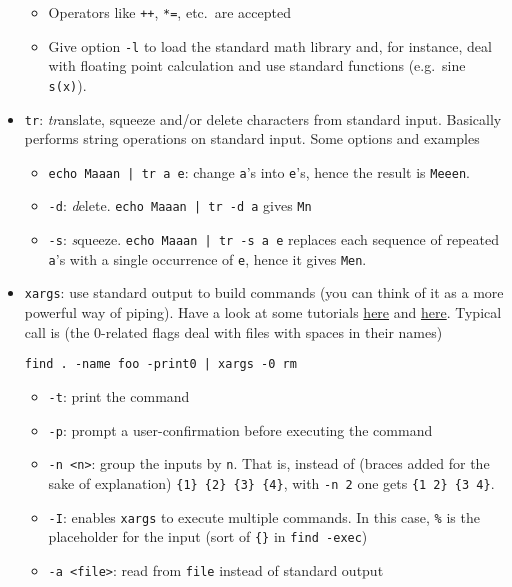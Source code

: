 \documentclass[a4paper,12pt,%
              final%
              ]{article}
\begin{document}
\begin{itemize}
\begin{itemize}
\begin{itemize}
        \end{itemize}
      \item Operators like \verb|++|, \verb|*=|, etc.\ are accepted
      \item Give option \verb|-l| to load the standard math library and, for instance, deal with floating point calculation and use standard functions (e.g.\ sine \verb|s(x)|).
    \end{itemize}
  \item \texttt{tr}: \emph{tr}anslate, squeeze and/or delete characters from standard input. Basically performs string operations on standard input. Some options and examples
    \begin{itemize}
      \item \verb!echo Maaan | tr a e!: change \texttt{a}'s into \texttt{e}'s, hence the result is \texttt{Meeen}.
      \item \verb|-d|: \emph{d}elete. \verb!echo Maaan | tr -d a! gives \texttt{Mn}
      \item \verb|-s|: \emph{s}queeze. \verb!echo Maaan | tr -s a e! replaces each sequence of repeated \texttt{a}'s with a single occurrence of \texttt{e}, hence it gives \texttt{Men}.
    \end{itemize}
  \item \texttt{xargs}: use standard output to build commands (you can think of it as a more powerful way of piping). Have a look at some tutorials \href{https://shapeshed.com/unix-xargs/}{here} and \href{https://www.thegeekstuff.com/2013/12/xargs-examples/}{here}. Typical call is (the 0-related flags deal with files with spaces in their names)
\begin{verbatim}
find . -name foo -print0 | xargs -0 rm
\end{verbatim}
    \begin{itemize}
      \item \texttt{-t}: print the command
      \item \texttt{-p}: prompt a user-confirmation before executing the command
      \item \texttt{-n <n>}: group the inputs by \texttt{n}. That is, instead of (braces added for the sake of explanation) \verb|{1} {2} {3} {4}|, with \texttt{-n 2} one gets \verb|{1 2} {3 4}|.
      \item \texttt{-I}: enables \texttt{xargs} to execute multiple commands. In this case, \verb|%| is the placeholder for the input (sort of \verb|{}| in \verb|find -exec|)
      \item \texttt{-a <file>}: read from \texttt{file} instead of standard output

\end{itemize}
\end{itemize}
\end{document}

